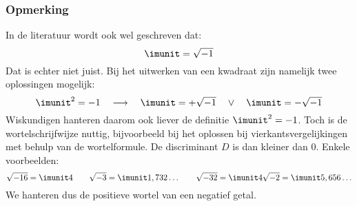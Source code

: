 \subsubsection*{Opmerking}
In de literatuur wordt ook wel geschreven dat:
%
\begin{equation}
\imunit = \sqrt{-1}
\end{equation}
%
Dat is echter niet juist. Bij het uitwerken van een kwadraat zijn namelijk twee oplossingen mogelijk:
%
\begin{equation}
\imunit^2 = -1 \quad \longrightarrow \quad \imunit = +\sqrt{-1} \quad\vee\quad \imunit = -\sqrt{-1}
\end{equation}
%
Wiskundigen hanteren daarom ook liever de definitie $\imunit^2=-1$. Toch is de wortelschrijfwijze nuttig, bijvoorbeeld bij het oplossen bij vierkantsvergelijkingen met behulp van de wortelformule. De discriminant $D$ is dan kleiner dan 0. Enkele voorbeelden:
%
\begin{equation}
\sqrt{-16} = \imunit 4 \qquad \sqrt{-3} = \imunit 1,732\ldots \qquad \sqrt{-32} = \imunit4\sqrt{-2} = \imunit5,656\ldots
\end{equation}
%
We hanteren dus de positieve wortel van een negatief getal.

%

